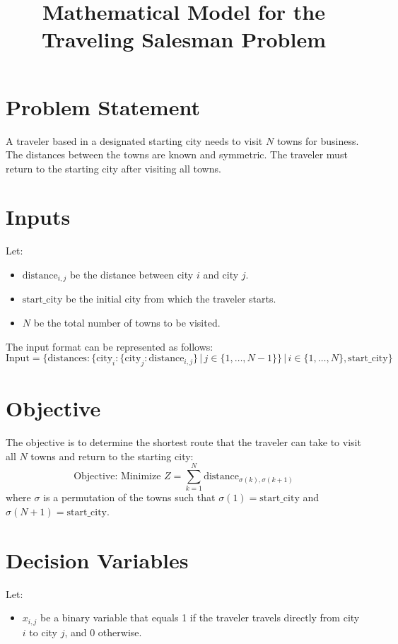 \documentclass{article}
\begin{document}
\title{Mathematical Model for the Traveling Salesman Problem}
\author{}
\date{}
\maketitle

\section*{Problem Statement}
A traveler based in a designated starting city needs to visit \( N \) towns for business. The distances between the towns are known and symmetric. The traveler must return to the starting city after visiting all towns.

\section*{Inputs}
Let:
\begin{itemize}
    \item \( \text{distance}_{i,j} \) be the distance between city \( i \) and city \( j \).
    \item \( \text{start\_city} \) be the initial city from which the traveler starts.
    \item \( N \) be the total number of towns to be visited.
\end{itemize}

The input format can be represented as follows:
\[
\text{Input} = \{ \text{distances}: \{ \text{city}_i: \{ \text{city}_j: \text{distance}_{i,j} \} \,|\, j \in \{1, \ldots, N-1\} \} \,|\, i \in \{1, \ldots, N\}, \text{start\_city} \}
\]

\section*{Objective}
The objective is to determine the shortest route that the traveler can take to visit all \( N \) towns and return to the starting city:
\[
\text{Objective: Minimize } Z = \sum_{k=1}^{N} \text{distance}_{\sigma(k), \sigma(k+1)}
\]
where \( \sigma \) is a permutation of the towns such that \( \sigma(1) = \text{start\_city} \) and \( \sigma(N+1) = \text{start\_city} \).

\section*{Decision Variables}
Let:
\begin{itemize}
    \item \( x_{i,j} \) be a binary variable that equals 1 if the traveler travels directly from city \( i \) to city \( j \), and 0 otherwise.
\end{itemize}
\end{document}
